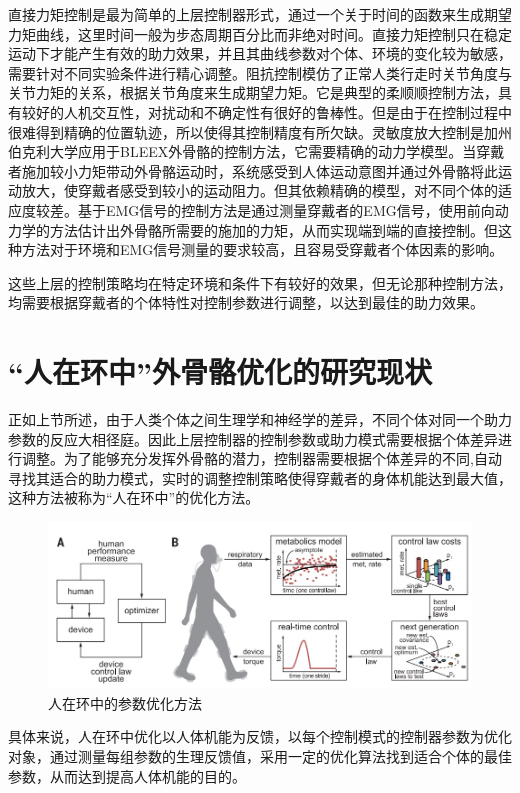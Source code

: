 直接力矩控制是最为简单的上层控制器形式，通过一个关于时间的函数来生成期望力矩曲线\cite{p32,p33}，这里时间一般为步态周期百分比而非绝对时间。直接力矩控制只在稳定运动下才能产生有效的助力效果，并且其曲线参数对个体、环境的变化较为敏感，需要针对不同实验条件进行精心调整。阻抗控制模仿了正常人类行走时关节角度与关节力矩的关系，根据关节角度来生成期望力矩\cite{p34}。它是典型的柔顺顺控制方法，具有较好的人机交互性，对扰动和不确定性有很好的鲁棒性。但是由于在控制过程中很难得到精确的位置轨迹，所以使得其控制精度有所欠缺。灵敏度放大控制是加州伯克利大学应用于BLEEX外骨骼的控制方法\cite{p35}，它需要精确的动力学模型。当穿戴者施加较小力矩带动外骨骼运动时，系统感受到人体运动意图并通过外骨骼将此运动放大，使穿戴者感受到较小的运动阻力。但其依赖精确的模型，对不同个体的适应度较差。基于EMG信号的控制方法是通过测量穿戴者的EMG信号，使用前向动力学的方法估计出外骨骼所需要的施加的力矩，从而实现端到端的直接控制\cite{p36}。但这种方法对于环境和EMG信号测量的要求较高，且容易受穿戴者个体因素的影响。

这些上层的控制策略均在特定环境和条件下有较好的效果，但无论那种控制方法，均需要根据穿戴者的个体特性对控制参数进行调整，以达到最佳的助力效果。

\section{“人在环中”外骨骼优化的研究现状}

正如上节所述，由于人类个体之间生理学和神经学的差异，不同个体对同一个助力参数的反应大相径庭\cite{p37}。因此上层控制器的控制参数或助力模式需要根据个体差异进行调整。为了能够充分发挥外骨骼的潜力，控制器需要根据个体差异的不同,自动寻找其适合的助力模式，实时的调整控制策略使得穿戴者的身体机能达到最大值，这种方法被称为“人在环中”的优化方法\cite{p38}。
\begin{figure}[!htb]
    \includegraphics[width=15cm]{fig/f18.jpg}
    \caption{人在环中的参数优化方法\cite{p40}}
    \label{fig:mark}
\end{figure}

具体来说，人在环中优化以人体机能为反馈，以每个控制模式的控制器参数为优化对象，通过测量每组参数的生理反馈值，采用一定的优化算法找到适合个体的最佳参数，从而达到提高人体机能的目的。

